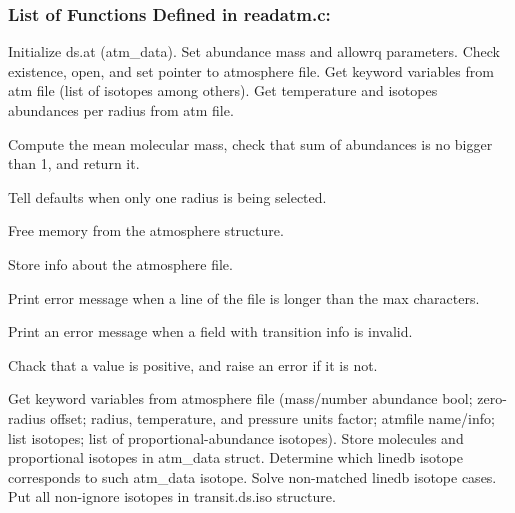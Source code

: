 \documentclass[letterpaper,12pt]{article}
\begin{document}
\subsubsection{List of Functions Defined in readatm.c:}
Initialize ds.at (atm\_data).  Set abundance mass and allowrq parameters.
Check existence, open, and set pointer to atmosphere file.
Get keyword variables from atm file (list of isotopes among others).
Get temperature and isotopes abundances per radius from atm file. \newline

Compute the mean molecular mass, check that sum of abundances
is no bigger than 1, and return it. \newline

Tell defaults when only one radius is being selected. \newline

Free memory from the atmosphere structure. \newline

Store info about the atmosphere file. \newline

Print error message when a line of the file is longer than the max characters. \newline

Print an error message when a field with transition info is invalid. \newline

Chack that a value is positive, and raise an error if it is not. \newline

Get keyword variables from atmosphere file (mass/number abundance bool;
zero-radius offset; radius, temperature, and pressure units factor;
atmfile name/info; list isotopes; list of proportional-abundance isotopes).
Store molecules and proportional isotopes in atm\_data struct.
Determine which linedb isotope corresponds to such atm\_data isotope.
Solve non-matched linedb isotope cases.
Put all non-ignore isotopes in transit.ds.iso structure. \newline
\end{document}
